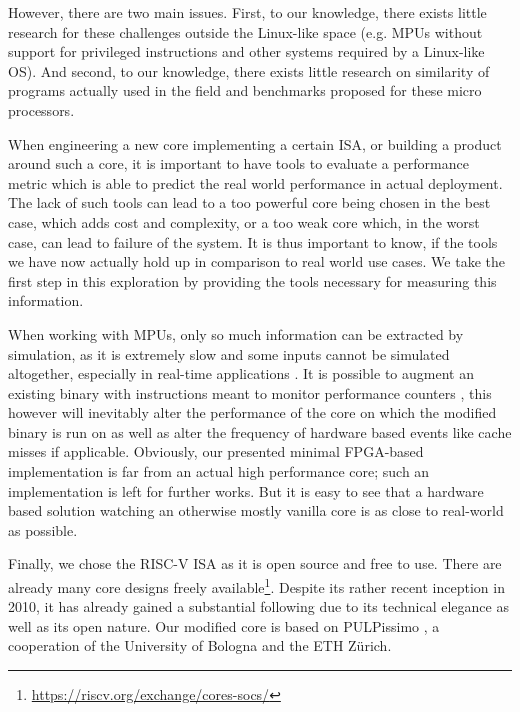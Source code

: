 \documentclass[../bachelor_paper.tex]{subfiles}
\begin{document}
However, there are two main issues. First, to our knowledge, there exists little research for these challenges outside the Linux-like space (e.g. \acs{MPU}s without support for privileged instructions and other systems required by a Linux-like \acs{OS}). And second, to our knowledge, there exists little research on similarity of programs actually used in the field and benchmarks proposed for these micro processors.

When engineering a new core implementing a certain \acs{ISA}, or building a product around such a core, it is important to have tools to evaluate a performance metric which is able to predict the real world performance in actual deployment. The lack of such tools can lead to a too powerful core being chosen in the best case, which adds cost and complexity, or a too weak core which, in the worst case, can lead to failure of the system. It is thus important to know, if the tools we have now actually hold up in comparison to real world use cases. We take the first step in this exploration by providing the tools necessary for measuring this information.

When working with \acs{MPU}s, only so much information can be extracted by simulation, as it is extremely slow \cite{eeckhoutDesigningComputerArchitecture2003,kaoHardwareApproachRealTime2007} and some inputs cannot be simulated altogether, especially in real-time applications \cite{kaoHardwareApproachRealTime2007}. It is possible to augment an existing binary with instructions meant to monitor performance counters \cite{eeckhoutQuantifyingImpactInput}, this however will inevitably alter the performance of the core on which the modified binary is run on as well as alter the frequency of hardware based events like cache misses if applicable. Obviously, our presented minimal FPGA-based implementation is far from an actual high performance core; such an implementation is left for further works. But it is easy to see that a hardware based solution watching an otherwise mostly vanilla core is as close to real-world as possible.

Finally, we chose the RISC-V ISA \cite{RISCVTechnicalSpecification} as it is open source and free to use. There are already many core designs freely available\footnote{\url{https://riscv.org/exchange/cores-socs/}}. Despite its rather recent inception in 2010, it has already gained a substantial following due to its technical elegance as well as its open nature. Our modified core is based on PULPissimo \cite{PulpplatformPulpissimo2021}, a cooperation of the University of Bologna and the ETH Z\"urich.
\end{document}
